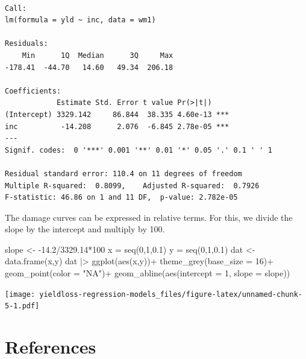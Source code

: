 \documentclass[
  letterpaper,
]{book}
\newenvironment{Shaded}{\begin{snugshade}}{\end{snugshade}}
\newcommand{\AttributeTok}[1]{\textcolor[rgb]{0.40,0.45,0.13}{#1}}
\newcommand{\DecValTok}[1]{\textcolor[rgb]{0.68,0.00,0.00}{#1}}
\newcommand{\FloatTok}[1]{\textcolor[rgb]{0.68,0.00,0.00}{#1}}
\newcommand{\FunctionTok}[1]{\textcolor[rgb]{0.28,0.35,0.67}{#1}}
\newcommand{\NormalTok}[1]{\textcolor[rgb]{0.00,0.23,0.31}{#1}}
\newcommand{\OtherTok}[1]{\textcolor[rgb]{0.00,0.23,0.31}{#1}}
\newcommand{\SpecialCharTok}[1]{\textcolor[rgb]{0.37,0.37,0.37}{#1}}
\newcommand{\StringTok}[1]{\textcolor[rgb]{0.13,0.47,0.30}{#1}}
\begin{document}
\begin{verbatim}

Call:
lm(formula = yld ~ inc, data = wm1)

Residuals:
    Min      1Q  Median      3Q     Max 
-178.41  -44.70   14.60   49.34  206.18 

Coefficients:
            Estimate Std. Error t value Pr(>|t|)    
(Intercept) 3329.142     86.844  38.335 4.60e-13 ***
inc          -14.208      2.076  -6.845 2.78e-05 ***
---
Signif. codes:  0 '***' 0.001 '**' 0.01 '*' 0.05 '.' 0.1 ' ' 1

Residual standard error: 110.4 on 11 degrees of freedom
Multiple R-squared:  0.8099,    Adjusted R-squared:  0.7926 
F-statistic: 46.86 on 1 and 11 DF,  p-value: 2.782e-05
\end{verbatim}

The damage curves can be expressed in relative terms. For this, we
divide the slope by the intercept and multiply by 100.

\begin{Shaded}
\begin{Highlighting}[]
\NormalTok{slope }\OtherTok{\textless{}{-}} \SpecialCharTok{{-}}\FloatTok{14.2}\SpecialCharTok{/}\FloatTok{3329.14}\SpecialCharTok{*}\DecValTok{100}
\NormalTok{x }\OtherTok{=} \FunctionTok{seq}\NormalTok{(}\DecValTok{0}\NormalTok{,}\DecValTok{1}\NormalTok{,}\FloatTok{0.1}\NormalTok{)}
\NormalTok{y }\OtherTok{=} \FunctionTok{seq}\NormalTok{(}\DecValTok{0}\NormalTok{,}\DecValTok{1}\NormalTok{,}\FloatTok{0.1}\NormalTok{)}
\NormalTok{dat }\OtherTok{\textless{}{-}} \FunctionTok{data.frame}\NormalTok{(x,y)}
\NormalTok{dat }\SpecialCharTok{|\textgreater{}} 
  \FunctionTok{ggplot}\NormalTok{(}\FunctionTok{aes}\NormalTok{(x,y))}\SpecialCharTok{+}
  \FunctionTok{theme\_grey}\NormalTok{(}\AttributeTok{base\_size =} \DecValTok{16}\NormalTok{)}\SpecialCharTok{+}
  \FunctionTok{geom\_point}\NormalTok{(}\AttributeTok{color =} \StringTok{"NA"}\NormalTok{)}\SpecialCharTok{+}  
  \FunctionTok{geom\_abline}\NormalTok{(}\FunctionTok{aes}\NormalTok{(}\AttributeTok{intercept =} \DecValTok{1}\NormalTok{, }\AttributeTok{slope =}\NormalTok{ slope))}
\end{Highlighting}
\end{Shaded}

\texttt{[image: yieldloss-regression-models\_files/figure-latex/unnamed-chunk-5-1.pdf]}


\hypertarget{references}{%
\chapter*{References}\label{references}}
\end{document}
